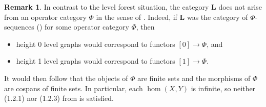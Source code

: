 \documentclass{amsart}
\numberwithin{theorem}{subsection}
\theoremstyle{definition}
\newtheorem{remark}[theorem]{Remark}
\newcommand{\levelg}{\mathbf{L}}
\begin{document}
\begin{remark}\label{remark level not phi seq}
In contrast to the level forest situation, the category $\levelg$ does not arise from an operator category $\Phi$ in the sense of \cite[Definition 1.2]{bar}. 
Indeed, if $\levelg$ was the category of $\Phi$-sequences (\cite[Definition 2.4]{bar}) for some operator category $\Phi$, then
\begin{itemize}
\item height 0 level graphs would correspond to functors $[0] \to \Phi$, and
\item height 1 level graphs would correspond to functors $[1] \to \Phi$.
\end{itemize}
It would then follow that the objects of $\Phi$ are finite sets and the morphisms of $\Phi$ are cospans of finite sets.
In particular, each $\hom(X,Y)$ is infinite, so neither (1.2.1) nor (1.2.3) from \cite{bar} is satisfied.
\end{remark}
\end{document}
